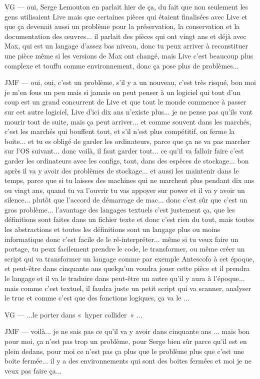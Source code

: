 VG — oui, Serge Lemouton en parlait hier de ça, du fait que non seulement les gens utilisaient Live mais que certaines pièces qui étaient finalisées avec Live et que ça devenait aussi un problème pour la préservation, la conservation et la documentation des œuvres... il parlait des pièces qui ont vingt ans et déjà avec Max, qui est un langage d'assez bas niveau, donc tu peux arriver à reconstituer une pièce même si les versions de Max ont changé, mais Live c'est beaucoup plus complexe et touffu comme environnement, donc ça pose plus de problèmes... 

JMF — oui, oui, c'est un problème, s'il y a un nouveau, c'est très risqué, bon moi je m'en fous un peu mais si jamais on peut penser à un logiciel qui tout d'un coup est un grand concurrent de Live et que tout le monde commence à passer sur cet autre logiciel, Live d'ici dix ans n'existe plus... je ne pense pas qu'ils vont mourir tout de suite, mais ça peut arriver... et comme souvent dans les marchés, c'est les marchés qui bouffent tout, et s'il n'est plus compétitif, on ferme la boite... et tu es obligé de garder les ordinateurs, parce que ça ne va pas marcher sur l'OS suivant... donc voilà, il faut garder tout... ce qu'il va falloir faire c'est garder les ordinateurs avec les configs, tout, dans des espèces de stockage... bon après il va y avoir des problèmes de stockage... et aussi les maintenir dans le temps, parce que si tu laisses des machines qui ne marchent plus pendant dix ans ou vingt ans, quand tu va l'ouvrir tu vas appoyer sur power et il va y avoir un silence... plutôt que l'accord de démarrage de mac... donc c'est sûr que c'est un gros problème... l'avantage des langages textuels c'est justement ça, que les définitions sont faites dans un fichier texte et donc c'est rien du tout, mais toutes les abstractions et toutes les définitions sont un langage plus ou moins informatique donc c'est facile de le ré-interpréter... même si tu veux faire un portage, tu peux facilement prendre le code, le transformer, ou même créer un script qui va transformer un langage comme par exemple Antescofo à cet époque, et peut-être dans cinquante ans quelqu'un voudra jouer cette pièce et il prendra le langage et il va le traduire dans peut-être un autre qu'il y aura à l'époque... mais comme c'est textuel, il faudra juste un petit script qui va scanner, analyser le truc et comme c'est que des fonctions logiques, ça va le ... 

VG — ...le porter dans « hyper collider » ... 

JMF — voilà... je ne sais pas ce qu'il va y avoir dans cinquante ans ... mais bon pour moi, ça n'est pas trop un problème, pour Serge bien sûr parce qu'il est en plein dedans, pour moi ce n'est pas ça plus que le problème plus que c'est une boite fermée... il y a des environnements qui sont des boites fermées et moi je ne veux pas faire ça... 

